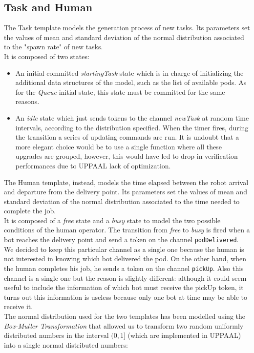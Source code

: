 \documentclass{article}
\begin{document}
		\subsection{Task and Human}
			\label{sub:TaskAndHuman}
			The Task template models the generation process of new tasks. Its parameters set the values of mean and standard deviation of the normal distribution associated to the "spawn rate" of new tasks.\\
			It is composed of two states:
			\begin{itemize}
				\item An initial committed \emph{startingTask} state which is in charge of initializing the additional data structures of the model, such as the list of available pods. As for the \emph{Queue} initial state, this state must be committed for the same reasons.
				\item An \emph{idle} state which just sends tokens to the channel \emph{newTask} at random time intervals, according to the distribution specified. When the timer fires, during the transition a series of updating commands are run. It is undoubt that a more elegant choice would be to use a single function where all these upgrades are grouped, however, this would have led to drop in verification performances due to UPPAAL lack of optimization.
			\end{itemize}
			The Human template, instead, models the time elapsed between the robot arrival and departure from the delivery point. Its parameters set the values of mean and standard deviation of the normal distribution associated to the time needed to complete the job.\\
			It is composed of a \emph{free} state and a \emph{busy} state to model the two possible conditions of the human operator. The transition from \emph{free} to \emph{busy} is fired when a bot reaches the delivery point and send a token on the channel \verb|podDelivered|. We decided to keep this particular channel as a single one because the human is not interested in knowing which bot delivered the pod. On the other hand, when the human completes his job, he sends a token on the channel \verb|pickUp|. Also this channel is a single one but the reason is slightly different: although it could seem useful to include the information of which bot must receive the pickUp token, it turns out this information is useless because only one bot at time may be able to receive it.\\
			The normal distribution used for the two templates has been modelled using the \emph{Box-Muller Transformation} that allowed us to transform two random uniformly distributed numbers in the interval $(0,1]$ (which are implemented in UPPAAL) into a single normal distributed numbers:
\end{document}
